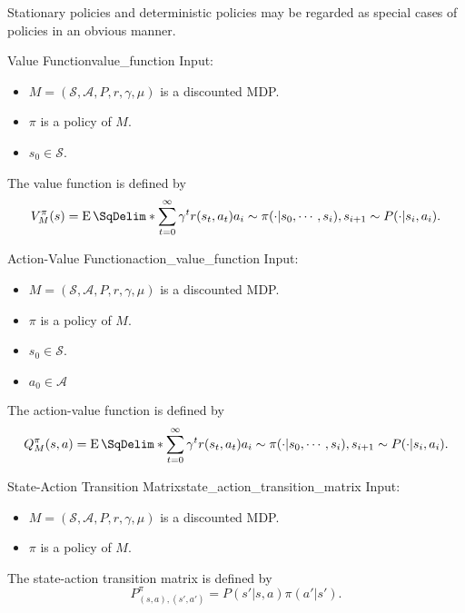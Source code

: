 \documentclass{article}
\begin{document}
Stationary policies and deterministic policies may be regarded as special cases of policies in an obvious manner.

\begin{definition}{Value Function}{value_function}
    Input:
    \begin{itemize}
        \item $M=(\mathcal{S}, \mathcal{A}, P, r, \gamma, \mu)$ is a discounted MDP.
        \item $\pi$ is a policy of $M$.
        \item $s_0\in \mathcal{S}$.
    \end{itemize}
    The value function is defined by
    \[ V^\pi_M(s) = \operatorname{E}\SqDelim*{\sum_{t=0}^\infty \gamma^t r(s_t,a_t)}{a_i\sim \pi(\cdot|s_0,\cdots, s_i), s_{i+1}\sim P(\cdot|s_i,a_i)}. \]
\end{definition}

\begin{definition}{Action-Value Function}{action_value_function}
    Input:
    \begin{itemize}
        \item $M=(\mathcal{S}, \mathcal{A}, P, r, \gamma, \mu)$ is a discounted MDP.
        \item $\pi$ is a policy of $M$.
        \item $s_0\in \mathcal{S}$.
        \item $a_0\in \mathcal{A}$
    \end{itemize}
    The action-value function is defined by
    \[ Q^\pi_M(s,a) = \operatorname{E}\SqDelim*{\sum_{t=0}^\infty \gamma^t r(s_t,a_t)}{a_i\sim \pi(\cdot|s_0,\cdots, s_i), s_{i+1}\sim P(\cdot|s_i,a_i)}. \]
\end{definition}

\begin{definition}{State-Action Transition Matrix}{state_action_transition_matrix}
    Input:
    \begin{itemize}
        \item $M=(\mathcal{S}, \mathcal{A}, P, r, \gamma, \mu)$ is a discounted MDP.
        \item $\pi$ is a policy of $M$.
    \end{itemize}
    The state-action transition matrix is defined by
    \[ P^\pi_{(s,a),(s',a')} = P(s'|s,a)\pi(a'|s'). \]
\end{definition}
\end{document}
